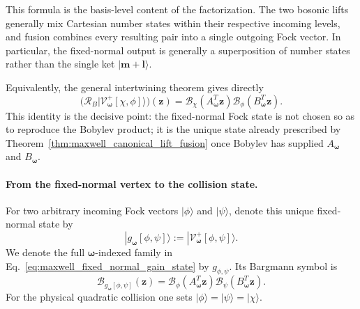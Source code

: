 \documentclass[11pt,oneside]{article}
\numberwithin{equation}{section}
\theoremstyle{definition}
\begin{document}
This formula is the basis-level content of the factorization.  The two bosonic lifts generally mix Cartesian number states within their respective incoming levels, and fusion combines every resulting pair into a single outgoing Fock vector.  In particular, the fixed-normal output is generally a superposition of number states rather than the single ket $|\bm m+\bm l\rangle$.

Equivalently, the general intertwining theorem gives directly
\begin{equation}
\bigl(\mathcal R_B|\mathcal V_{\bm\omega}^{+}[\chi,\phi]\rangle\bigr)(\bm z)
=
\mathscr B_\chi(A_{\bm\omega}^T\bm z)
\mathscr B_\phi(B_{\bm\omega}^T\bm z).
\label{eq:maxwell_fixed_normal_symbol}
\end{equation}
This identity is the decisive point: the fixed-normal Fock state is not chosen so as to reproduce the Bobylev product; it is the unique state already prescribed by Theorem~\ref{thm:maxwell_canonical_lift_fusion} once Bobylev has supplied $A_{\bm\omega}$ and $B_{\bm\omega}$.

\paragraph{From the fixed-normal vertex to the collision state.}
For two arbitrary incoming Fock vectors $|\phi\rangle$ and $|\psi\rangle$, denote this unique fixed-normal state by
\begin{equation}
|g_{\bm\omega}[\phi,\psi]\rangle
:=
|\mathcal V_{\bm\omega}^{+}[\phi,\psi]\rangle .
\label{eq:maxwell_fixed_normal_gain_state}
\end{equation}
We denote the full $\bm\omega$-indexed family in Eq.~\eqref{eq:maxwell_fixed_normal_gain_state} by $g_{\phi,\psi}$.  Its Bargmann symbol is
\begin{equation}
\mathscr B_{g_{\bm\omega}[\phi,\psi]}(\bm z)
=
\mathscr B_\phi(A_{\bm\omega}^T\bm z)
\mathscr B_\psi(B_{\bm\omega}^T\bm z).
\label{eq:maxwell_fixed_normal_gain_symbol}
\end{equation}
For the physical quadratic collision one sets $|\phi\rangle=|\psi\rangle=|\chi\rangle$.
\end{document}

